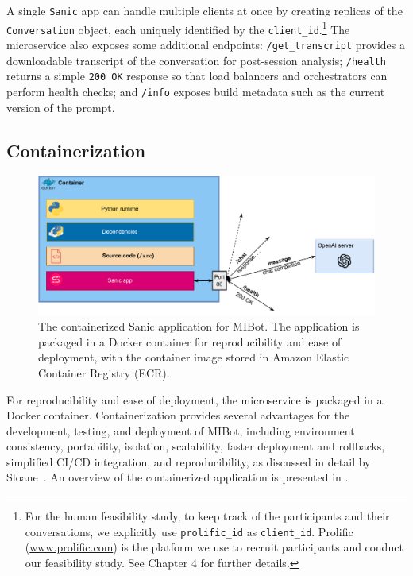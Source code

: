 A single \texttt{Sanic} app can handle multiple clients at once by creating replicas of the \texttt{Conversation} object, each uniquely identified by the \texttt{client\_id}.\footnote{For the human feasibility study, to keep track of the participants and their conversations, we explicitly use \texttt{prolific\_id} as \texttt{client\_id}. Prolific (\url{www.prolific.com}) is the platform we use to recruit participants and conduct our feasibility study. See Chapter 4 for further details.} The microservice also exposes some additional endpoints: \texttt{/get\_transcript} provides a downloadable transcript of the conversation for post-session analysis; \texttt{/health} returns a simple \texttt{200 OK} response so that load balancers and orchestrators can perform health checks; and \texttt{/info} exposes build metadata such as the current version of the prompt.

\subsection{Containerization}

\begin{figure}[ht]
  \centering
  \includegraphics[width=0.7\linewidth]{fig/container.drawio.pdf} 
  \caption[Containerized MIBot Application]{The containerized Sanic application for MIBot. The application is packaged in a Docker container for reproducibility and ease of deployment, with the container image stored in Amazon Elastic Container Registry (ECR).}
  \label{fig:containerization}
\end{figure}

For reproducibility and ease of deployment, the microservice is packaged in a Docker container. Containerization provides several advantages for the development, testing, and deployment of MIBot, including environment consistency, portability, isolation, scalability, faster deployment and rollbacks, simplified CI/CD integration, and reproducibility, as discussed in detail by Sloane~\citep{sloane2025containerization}. An overview of the containerized application is presented in .

